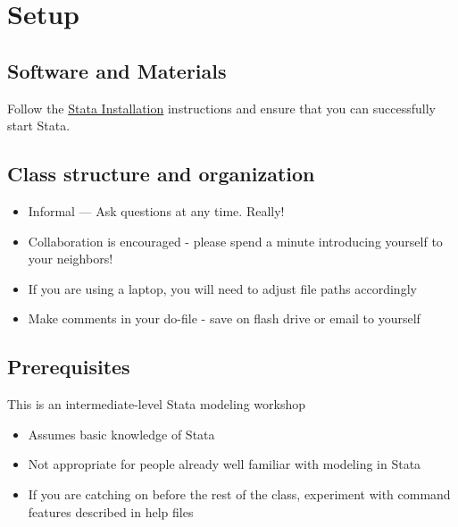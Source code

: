 \documentclass[
]{book}
\providecommand{\tightlist}{%
  \setlength{\itemsep}{0pt}\setlength{\parskip}{0pt}}
\begin{document}
\hypertarget{setup-8}{%
\section{Setup}\label{setup-8}}

\hypertarget{software-and-materials-8}{%
\subsection{Software and Materials}\label{software-and-materials-8}}

Follow the \href{./StataInstall.html}{Stata Installation} instructions and ensure that you can successfully start Stata.

\hypertarget{class-structure-and-organization-2}{%
\subsection{Class structure and organization}\label{class-structure-and-organization-2}}

\begin{itemize}
\tightlist
\item
  Informal --- Ask questions at any time. Really!
\item
  Collaboration is encouraged - please spend a minute introducing yourself to your neighbors!
\item
  If you are using a laptop, you will need to adjust file paths accordingly
\item
  Make comments in your do-file - save on flash drive or email to yourself
\end{itemize}

\hypertarget{prerequisites-8}{%
\subsection{Prerequisites}\label{prerequisites-8}}

This is an intermediate-level Stata modeling workshop

\begin{itemize}
\tightlist
\item
  Assumes basic knowledge of Stata
\item
  Not appropriate for people already well familiar with modeling in Stata
\item
  If you are catching on before the rest of the class, experiment with command features described in help files
\end{itemize}
\end{document}
